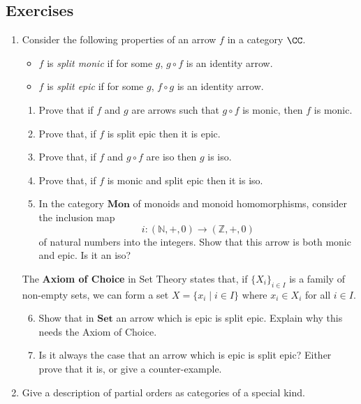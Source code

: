 \documentclass[12pt]{article}
\begin{document}
\subsection{Exercises}
\begin{enumerate}\renewcommand{\theenumi}{\textbf{\arabic{enumi}}}
    \item Consider the following properties of an arrow $f$ in a category $\CC$.
    \begin{itemize}
        \item $f$ is \emph{split monic} if for some $g$, $g \circ f$ is an  identity arrow.
        \item $f$ is \emph{split epic} if for some $g$, $f \circ g$ is an  identity arrow.
    \end{itemize}
    \begin{enumerate}
        \item Prove that if $f$ and $g$ are arrows such that $g \circ f$ is monic, then $f$ is monic.
        \item Prove that, if $f$ is split epic then it is epic.
        \item Prove that, if $f$ and $g \circ f$ are iso then $g$ is iso.
        \item Prove that, if $f$ is monic and split epic then it is iso.
        \item In the category $\mathbf{Mon}$ of monoids and monoid homomorphisms, consider the inclusion map
        \[ i : (\mathbb{N},{+}, 0) \longrightarrow (\mathbb{Z}, {+}, 0) \]
        of natural numbers into the integers. Show that this arrow is both monic and epic. Is it an iso?
    \end{enumerate}
      The \textbf{Axiom of Choice} in Set Theory states that, if $\{ X_{i} \}_{i \in I}$ is a family of non-empty sets, we can form a set
      $X=\{ x_{i}\mid i\in I \}$ where $x_{i} \in X_{i}$ for all $i \in I$.
    \begin{enumerate}\setcounter{enumii}{5}
      \item Show that in $\mathbf{Set}$ an arrow which is epic is split epic. Explain why this needs the Axiom of Choice.
      \item Is it always the case that an arrow which is epic is split epic? Either prove that it is, or give a counter-example.
    \end{enumerate}
    \item Give a description of partial orders as categories of a special kind.
\end{enumerate}
\end{document}
